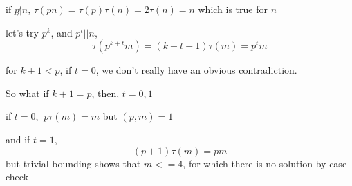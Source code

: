 if $p\not|n$, $\tau(pn)=\tau(p)\tau(n)= 2\tau(n)=n$ which is true for $n$

let's try $p^k$, and $p^t||n$,
\[\tau(p^{k+t}m)=(k+t+1)\tau(m)=p^tm\]

for $k+1 < p$, if $t=0$, we don't really have an obvious contradiction. 

So what if $k+1=p$, then, $t=0, 1$

if $t=0$, $\ p\tau(m)=m$ but $(p, m)=1$

and if $t=1$, \[(p+1)\tau(m)=pm\] but trivial bounding shows that $m<=4$, for which there is no solution by case check


